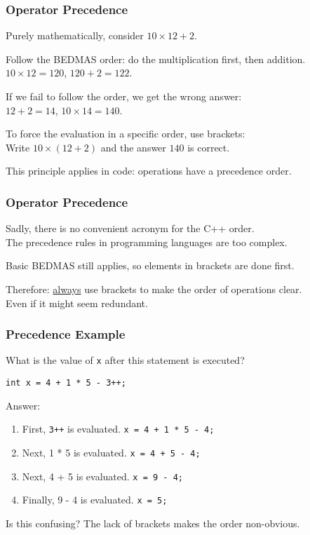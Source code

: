 \begin{frame}
\frametitle{Operator Precedence}

Purely mathematically, consider $10 \times 12 + 2$.

Follow the BEDMAS order: do the multiplication first, then addition.\\
$10 \times 12 = 120$, $120 + 2 = 122$.

If we fail to follow the order, we get the wrong answer:\\
$12 + 2 = 14$, $10 \times 14 = 140$.

To force the evaluation in a specific order, use brackets:\\
Write $10 \times (12 + 2)$ and the answer $140$ is correct.

This principle applies in code: operations have a precedence order.

\end{frame}

\begin{frame}
\frametitle{Operator Precedence}
Sadly, there is no convenient acronym for the C++ order.\\
\quad The precedence rules in programming languages are too complex.

Basic BEDMAS still applies, so elements in brackets are done first.

Therefore: \underline{always} use brackets to make the order of operations clear.\\
\quad Even if it might seem redundant.

\end{frame}

\begin{frame}
\frametitle{Precedence Example}

What is the value of \texttt{x} after this statement is executed?

\texttt{int x = 4 + 1 * 5 - 3++;}

Answer:
\begin{enumerate}
	\item First, \texttt{3++} is evaluated. \texttt{x = 4 + 1 * 5 - 4;}
	\item Next, 1 * 5 is evaluated. \texttt{x = 4 + 5 - 4;}
	\item Next, 4 + 5 is evaluated. \texttt{x = 9 - 4;}
	\item Finally, 9 - 4 is evaluated. \texttt{x = 5;}
\end{enumerate}

Is this confusing? The lack of brackets makes the order non-obvious.

\end{frame}


